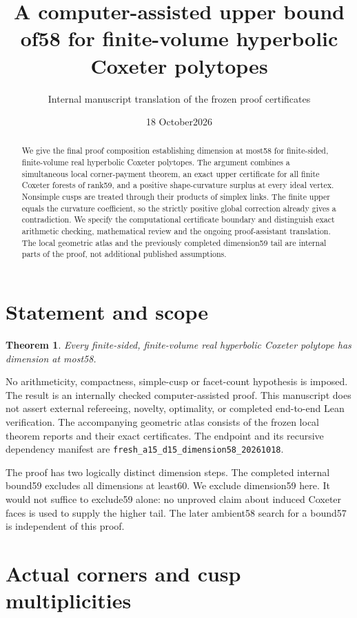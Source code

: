 \documentclass[11pt]{article}
\title{A computer-assisted upper bound of58 for finite-volume hyperbolic Coxeter polytopes}
\author{Internal manuscript translation of the frozen proof certificates}
\date{18 October2026}
\newtheorem{theorem}{Theorem}
\theoremstyle{remark}\newtheorem{remark}[theorem]{Remark}
\newcommand{\cert}[1]{\nolinkurl{#1}}
\begin{document}
\maketitle

\begin{abstract}
We give the final proof composition establishing dimension at most58 for
finite-sided, finite-volume real hyperbolic Coxeter polytopes. The argument
combines a simultaneous local corner-payment theorem, an exact upper
certificate for all finite Coxeter forests of rank59, and a positive
shape-curvature surplus at every ideal vertex. Nonsimple cusps are treated
through their products of simplex links. The finite upper equals the
curvature coefficient, so the strictly positive global correction already
gives a contradiction. We specify the computational certificate boundary
and distinguish exact arithmetic checking, mathematical review and the
ongoing proof-assistant translation. The local geometric atlas and the
previously completed dimension59 tail are internal parts of the proof,
not additional published assumptions.
\end{abstract}

\section{Statement and scope}

\begin{theorem}\label{thm:main}
Every finite-sided, finite-volume real hyperbolic Coxeter polytope has
dimension at most58.
\end{theorem}

No arithmeticity, compactness, simple-cusp or facet-count hypothesis is
imposed. The result is an internally checked computer-assisted proof.
This manuscript does not assert external refereeing, novelty, optimality,
or completed end-to-end Lean verification. The accompanying geometric
atlas consists of the frozen local theorem reports and their exact
certificates. The endpoint and its recursive dependency manifest are
\cert{fresh_a15_d15_dimension58_20261018}.

The proof has two logically distinct dimension steps. The completed
internal bound59 excludes all dimensions at least60. We exclude
dimension59 here. It would not suffice to exclude59 alone: no unproved
claim about induced Coxeter faces is used to supply the higher tail.
The later ambient58 search for a bound57 is independent of this proof.

\section{Actual corners and cusp multiplicities}
\end{document}
